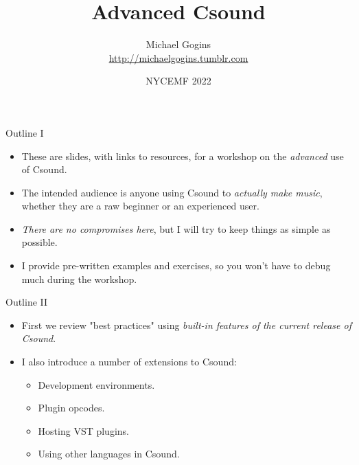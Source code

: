 \documentclass{beamer}
\title{Advanced Csound}
\author[Gogins] %
{Michael Gogins \\ \url{http://michaelgogins.tumblr.com} }
\institute[Irreducible Productions] %
{
    Irreducible Productions\\
    New York
}
\date[NYCEMF 2022] %
{NYCEMF 2022}
\begin{document}
    
    \begin{frame}
        \titlepage
    \end{frame}
    
    \begin{frame}{Outline I}
        \begin{itemize}
            \item These are slides, with links to resources, for a workshop on the
            \emph{advanced} use of Csound.
            \item The intended audience is anyone using Csound to \textit{actually make
                music}, whether they are a raw beginner or an experienced user.           
             \item \emph{There are no compromises here}, but I will try to keep things
            as simple as possible.
            
            \item I provide pre-written examples and exercises, so you won't have to debug much 
            during the workshop.
        \end{itemize}
    \end{frame}
    
    \begin{frame}{Outline II}
        \begin{itemize}
           \item First we review "best practices" using \textit{built-in features of
            the current release of Csound}.
            \item I also introduce a number of extensions to Csound: 
                \begin{itemize}
                    \item Development environments.
                    \item Plugin opcodes.
                    \item Hosting VST plugins.
                    \item Using other languages in Csound.
                \end{itemize}
        \end{itemize}
    \end{frame}
    
\end{document}
